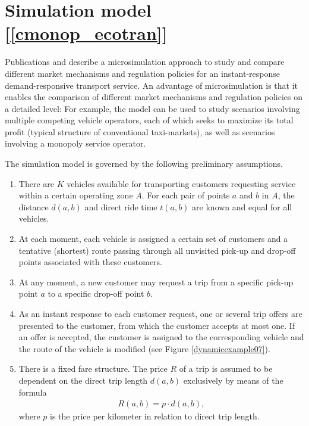 \documentclass[dissertation,draft*]{aaltoseries}
\begin{document}
\section{Simulation model [\ref{cmonop_ecotran}]}
\label{simulationmodel}
Publications  and  describe a microsimulation approach to 
study and compare different market mechanisms and regulation policies for
an instant-response demand-responsive transport service. An advantage of microsimulation is that 
it enables the comparison of different market mechanisms and regulation policies on a detailed level:
For example, the model can be used to study scenarios involving multiple competing vehicle operators,
each of which seeks to maximize its total profit (typical structure of conventional taxi-markets), as well as
scenarios involving a monopoly service operator.

The simulation model is governed by the following preliminary assumptions.
\begin{enumerate}
\item
There are $K$ vehicles available for transporting customers requesting service within a certain operating zone $A$. For each pair of points $a$ and $b$ in $A$, the distance $d(a,b)$ and direct ride time $t(a,b)$ are known and equal for all vehicles.
\item
At each moment, each vehicle is assigned a certain set of customers and a tentative (shortest) route passing through all 
unvisited pick-up and drop-off points associated with these customers. 
\item
At any moment, a new customer may request a trip from a specific pick-up point $a$ to a specific drop-off 
point $b$.
\item
As an instant response to each customer request, one or several trip offers are presented to the customer, from which the customer
accepts at most one. If an offer is accepted, the customer is assigned to the corresponding vehicle and the route of the vehicle
is modified (see Figure \ref{dynamicexample07}).
	\item
	There is a fixed fare structure. 
	The price $R$ of a trip is assumed to be dependent on the direct trip 
	length $d(a,b)$ exclusively by means of the formula
	\begin{align}
R(a,b)=p\cdot d(a,b),
\end{align}
where $p$ is the price per kilometer in relation to direct trip length.
\end{enumerate}
\end{document}
